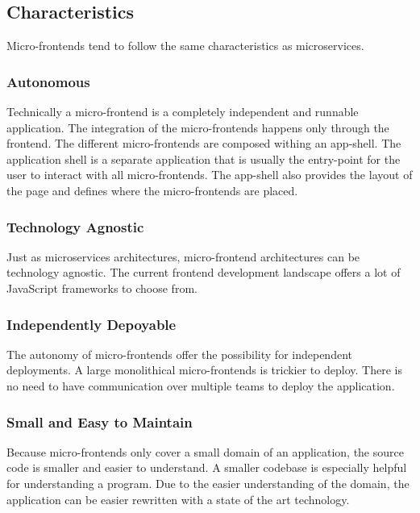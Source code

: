 \subsection{Characteristics}

Micro-frontends tend to follow the same characteristics as microservices.

\subsubsection{Autonomous}

Technically a micro-frontend is a completely independent and runnable application.
The integration of the micro-frontends happens only through the frontend. The different micro-frontends are composed withing an app-shell. The application shell is a separate application that is usually the entry-point for the user to interact with all micro-frontends. The app-shell also provides the layout of the page and defines where the micro-frontends are placed. \cite{book:2020:geers:background:micro-frontends:micro-frontends-in-action}

\subsubsection{Technology Agnostic}

Just as microservices architectures, micro-frontend architectures can be technology agnostic. The current frontend development landscape offers a lot of JavaScript frameworks to choose from.

\subsubsection{Independently Depoyable}

The autonomy of micro-frontends offer the possibility for independent deployments. A large monolithical micro-frontends is trickier to deploy. There is no need to have communication over multiple teams to deploy the application.


\subsubsection{Small and Easy to Maintain}

Because micro-frontends only cover a small domain of an application, the source code is smaller and easier to understand. A smaller codebase is especially helpful for understanding a program. 
Due to the easier understanding of the domain, the application can be easier rewritten with a state of the art technology. \cite{book:2020:geers:background:micro-frontends:micro-frontends-in-action}

